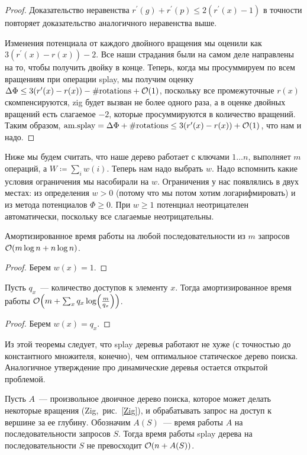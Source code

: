 \begin{proof}
	Доказательство неравенства $r^\prime(g) + r^\prime(p) \leq 2(r^\prime(x) - 1)$ в точности повторяет доказательство аналогичного неравенства выше.

	Изменения потенциала от каждого двойного вращения мы оценили как $3(r^\prime(x) - r(x)) - 2$. Все наши страдания были на самом деле направлены на то, чтобы получить двойку в конце. Теперь, когда мы просуммируем по всем вращениям при операции splay, мы получим оценку $\Delta\Phi \leq 3(r^\prime(x) - r(x)) - \#\text{rotations} + \mathcal{O}(1)$, поскольку все промежуточные $r(x)$ скомпенсируются, zig будет вызван не более одного раза, а в оценке двойных вращений есть слагаемое $-2$, которые просуммируются в количество вращений. Таким образом, $\text{am.splay} = \Delta\Phi + \#\text{rotations} \leq 3(r^\prime(x) - r(x)) + \mathcal{O}(1)$, что нам и надо.
\end{proof}

Ниже мы будем считать, что наше дерево работает с ключами $1 \ldots n$, выполняет $m$ операций, а $W \coloneqq \sum_i w(i)$. Теперь нам надо выбрать $w$. Надо вспомнить какие условия ограничения мы насобирали на $w$. Ограничения у нас появлялись в двух местах: из определения $w > 0$ (потому что мы потом хотим логарифмировать) и из метода потенциалов $\Phi \geq 0$. При $w \geq 1$ потенциал неотрицателен автоматически, поскольку все слагаемые неотрицательны.

\begin{corollary}
	Амортизированное время работы на любой последовательности из $m$ запросов $\BigO \parens*{m \log n + n \log n}$.
\end{corollary}
\begin{proof}
	Берем $w(x) = 1$.
\end{proof}

\begin{corollary}
	Пусть $q_x$~--- количество доступов к элементу $x$. Тогда амортизированное время работы $\BigO \parens*{m + \sum_x q_x \log \parens*{\frac{m}{q_x}}}$.
\end{corollary}
\begin{proof}
	Берем $w(x) = q_x$.
\end{proof}

Из этой теоремы следует, что splay деревья работают не хуже (с точностью до константного множителя, конечно), чем оптимальное статическое дерево поиска. Аналогичное утверждение про динамические деревья остается открытой проблемой.

\begin{conjecture}
	Пусть $A$~--- произвольное двоичное дерево поиска, которое может делать некоторые вращения (Zig,~рис.~\ref{Zig}), и обрабатывать запрос на доступ к вершине за ее глубину. Обозначим $A(S)$~--- время работы $A$ на последовательности запросов $S$. Тогда время работы splay дерева на последовательности $S$ не превосходит $\BigO \parens*{n + A(S)}$.
\end{conjecture}


